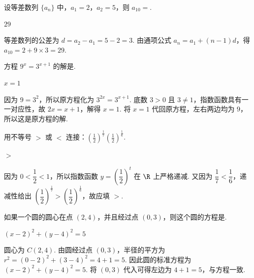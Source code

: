 \begin{problem}

设等差数列 \(\{a_n\}\) 中，\(a_1=2\)，\(a_2=5\)，则 \(a_{10}=\)\fillinblank{}.

\begin{answer}
\(29\)
\end{answer}

\begin{solution}
等差数列的公差为 \(d=a_2-a_1=5-2=3\). 由通项公式 \(a_n=a_1+(n-1)d\)，得 \(a_{10}=2+9\times3=29\).
\end{solution}
\end{problem}

\begin{problem}

方程 \(9^x=3^{x+1}\) 的解是\fillinblank{}.

\begin{answer}
\(x=1\)
\end{answer}

\begin{solution}
因为 \(9=3^2\)，所以原方程化为 \(3^{2x}=3^{x+1}\). 底数 \(3>0\) 且 \(3\neq1\)，指数函数具有一一对应性，故 \(2x=x+1\)，解得 \(x=1\). 将 \(x=1\) 代回原方程，左右两边均为 \(9\)，所以这是原方程的解.
\end{solution}
\end{problem}

\begin{problem}

用不等号 \(>\) 或 \(<\) 连接：\(\left(\frac{1}{2}\right)^{\frac{1}{7}}\)\fillinblank{}\(\left(\frac{1}{2}\right)^{\frac{1}{6}}\).

\begin{answer}
\(>\)
\end{answer}

\begin{solution}
因为 \(0<\dfrac{1}{2}<1\)，所以指数函数 \(y=\left(\dfrac{1}{2}\right)^t\) 在 \(\R\) 上严格递减. 又因为 \(\dfrac{1}{7}<\dfrac{1}{6}\)，递减性给出 \(\left(\dfrac{1}{2}\right)^{\frac{1}{7}}>\left(\dfrac{1}{2}\right)^{\frac{1}{6}}\)，故应填 \(>\).
\end{solution}
\end{problem}

\begin{problem}

如果一个圆的圆心在点 \((2,4)\)，并且经过点 \((0,3)\)，则这个圆的方程是\fillinblank{}.

\begin{answer}
\(\left(x-2\right)^2+\left(y-4\right)^2=5\)
\end{answer}

\begin{solution}
圆心为 \(C(2,4)\). 由圆经过点 \((0,3)\)，半径的平方为 \(r^2=(0-2)^2+(3-4)^2=4+1=5\). 因此圆的标准方程为 \(\left(x-2\right)^2+\left(y-4\right)^2=5\). 将 \((0,3)\) 代入可得左边为 \(4+1=5\)，与方程一致.
\end{solution}
\end{problem}

